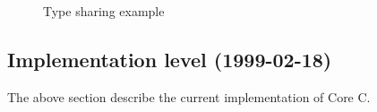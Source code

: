 \begin{docpart}
\begin{figure}[htbp]
\begin{center}
  \end{center}
  \caption{Type sharing example}
  \label{fig:typesharing}
\end{figure}

\subsection{Implementation level (1999-02-18)}
The above section describe the current implementation of Core C.
        
\end{docpart}
